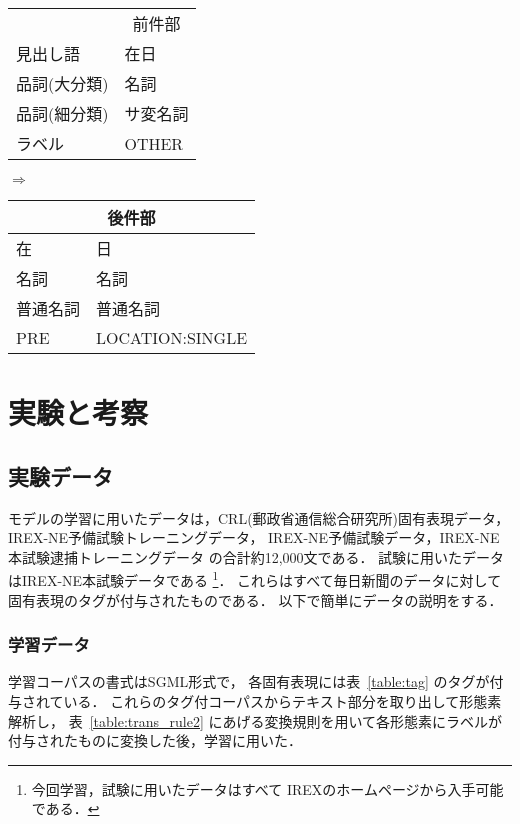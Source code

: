   \begin{center}
    \begin{tabular}[c]{l@{ }|l|}
      \multicolumn{1}{c}{} & \multicolumn{1}{c}{前件部} \\
      \cline{2-2}
      見出し語 & 在日 \\
      品詞(大分類) & 名詞 \\
      品詞(細分類) & サ変名詞 \\
      ラベル & OTHER \\
      \cline{2-2}
    \end{tabular}
    $\Rightarrow$
    \begin{tabular}[c]{|l@{ }l|}
      \multicolumn{2}{c}{後件部} \\
      \hline
      在 & 日 \\
      名詞 & 名詞 \\
      普通名詞 & 普通名詞 \\ 
      PRE & LOCATION:SINGLE \\
      \hline
    \end{tabular}
  \end{center}

\section{実験と考察}
\label{sec:exp}

\subsection{実験データ}
\label{sec:data}

モデルの学習に用いたデータは，CRL(郵政省通信総合研究所)固有表現データ，
IREX-NE予備試験トレーニングデータ，
IREX-NE予備試験データ，IREX-NE本試験逮捕トレーニングデータ
の合計約12,000文である．
試験に用いたデータはIREX-NE本試験データである
\footnote{
  今回学習，試験に用いたデータはすべて
  IREXのホームページ\cite{irex:homepage}から入手可能である．
}．
これらはすべて毎日新聞のデータに対して固有表現のタグが付与されたものである．
以下で簡単にデータの説明をする．

\subsubsection{学習データ}

学習コーパスの書式はSGML形式で，
各固有表現には表~\ref{table:tag} のタグが付与されている．
これらのタグ付コーパスからテキスト部分を取り出して形態素解析し，
表~\ref{table:trans_rule2} にあげる変換規則を用いて各形態素にラベルが
付与されたものに変換した後，学習に用いた．

